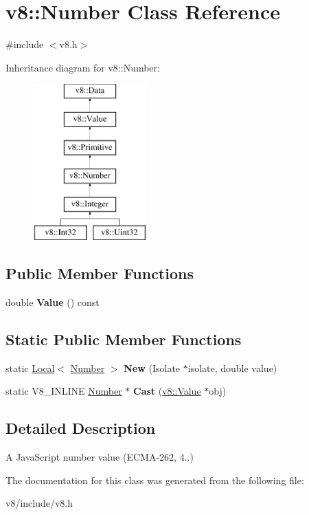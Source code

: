\hypertarget{classv8_1_1Number}{}\section{v8\+:\+:Number Class Reference}
\label{classv8_1_1Number}


{\ttfamily \#include $<$v8.\+h$>$}

Inheritance diagram for v8\+:\+:Number\+:\begin{figure}[H]
\begin{center}
\leavevmode
\includegraphics[height=6.000000cm]{classv8_1_1Number}
\end{center}
\end{figure}
\subsection*{Public Member Functions}
\begin{DoxyCompactItemize}
\item 
\mbox{\label{classv8_1_1Number_aed515db835eefc10820d45c60775e950}} 
double {\bfseries Value} () const
\end{DoxyCompactItemize}
\subsection*{Static Public Member Functions}
\begin{DoxyCompactItemize}
\item 
\mbox{\label{classv8_1_1Number_a90ea55018560648ffaf8861372b41928}} 
static \mbox{\hyperlink{classv8_1_1Local}{Local}}$<$ \mbox{\hyperlink{classv8_1_1Number}{Number}} $>$ {\bfseries New} (Isolate $\ast$isolate, double value)
\item 
\mbox{\label{classv8_1_1Number_a053d48e0003104308963a4a7e3881912}} 
static V8\+\_\+\+I\+N\+L\+I\+NE \mbox{\hyperlink{classv8_1_1Number}{Number}} $\ast$ {\bfseries Cast} (\mbox{\hyperlink{classv8_1_1Value}{v8\+::\+Value}} $\ast$obj)
\end{DoxyCompactItemize}


\subsection{Detailed Description}
A Java\+Script number value (E\+C\+M\+A-\/262, 4..) 

The documentation for this class was generated from the following file\+:\begin{DoxyCompactItemize}
\item 
v8/include/v8.\+h\end{DoxyCompactItemize}
